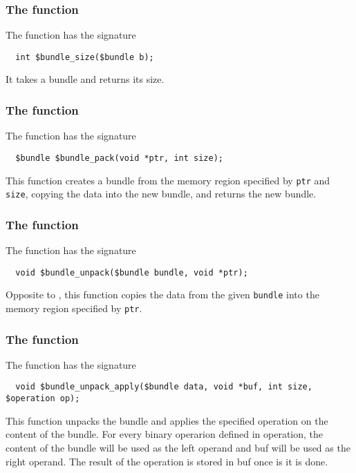 \subsubsection{The \cbundlesize{} function}

The \cbundlesize{} function has the signature
\begin{verbatim}
  int $bundle_size($bundle b);
\end{verbatim}

It takes a bundle and returns its size.

\subsubsection{The \cbundlepack{} function}

The \cbundlepack{} function has the signature
\begin{verbatim}
  $bundle $bundle_pack(void *ptr, int size);
\end{verbatim}

This function creates a bundle from the memory region specified by \texttt{ptr} and \texttt{size}, copying the data into the new bundle, and returns the new bundle.

\subsubsection{The \cbundleunpack{} function}

The \cbundleunpack{} function has the signature
\begin{verbatim}
  void $bundle_unpack($bundle bundle, void *ptr);
\end{verbatim}

Opposite to \cbundlepack, this function copies the data from the given \texttt{bundle} into the memory region specified by \texttt{ptr}. 

\subsubsection{The \cbundleunpackapply{} function}

The \cbundleunpackapply{} function has the signature
\begin{verbatim}
  void $bundle_unpack_apply($bundle data, void *buf, int size, $operation op);
\end{verbatim}

This function unpacks the bundle and applies the specified operation on the content of the bundle. For every binary operarion defined in operation, the  content of the bundle will be used as the left operand and buf will be used as the right operand. The result of the operation is stored in buf once is it is done.


